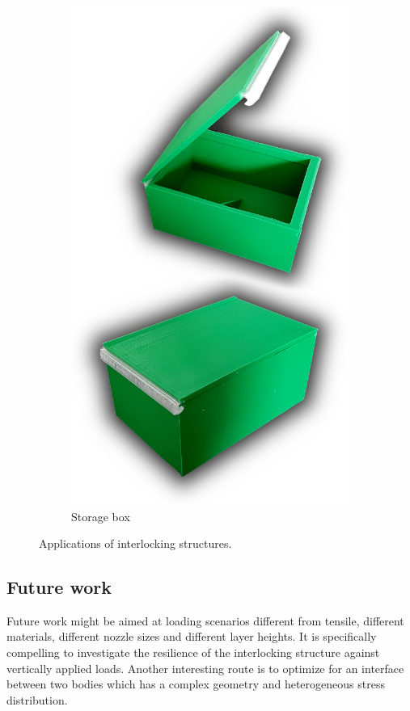 \begin{figure}
\begin{subfigure}[B]{.33\columnwidth}
		\includegraphics[width=\columnwidth]{sources/applications/storage_box.jpg}
		\caption{Storage box}
	\end{subfigure}
	\caption{Applications of interlocking structures.}
	\label{fig:applications}
\end{figure}




\subsection{Future work}
Future work might be aimed at loading scenarios different from tensile, different materials, different nozzle sizes and different layer heights.
It is specifically compelling to investigate the resilience of the interlocking structure against vertically applied loads.
Another interesting route is to optimize for an interface between two bodies which has a complex geometry and heterogeneous stress distribution.

